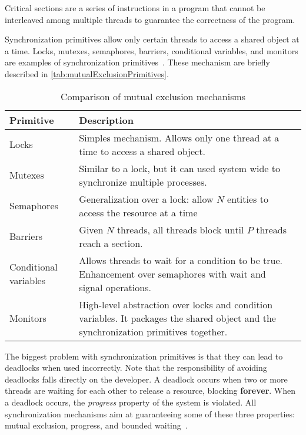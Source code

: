 \begin{tcolorbox}[colback=blue!5!white, colframe=blue!75!black, title=Critical Section]
    Critical sections are a series of instructions in a program that cannot
    be interleaved among multiple threads to guarantee the correctness of the program.
\end{tcolorbox}

Synchronization primitives allow
only certain threads to access a shared object at a time.
Locks, mutexes, semaphores, barriers, conditional variables, and monitors
are examples of synchronization primitives~\cite{andrews1983conceptsOfConcurrency,csf2025synchronizationPrimitives}.
These mechanism are briefly described in \autoref{tab:mutualExclusionPrimitives}.

\begin{table}[!htb]
    \caption{Comparison of mutual exclusion mechanisms}
    \label{tab:mutualExclusionPrimitives}
    \centering
    \begin{tabularx}{\textwidth}{|l|X|X|}
        \hline
        \textbf{Primitive} & \textbf{Description}\\
        \hline
        Locks & 
        Simples mechanism. Allows only one thread at a time to access a shared object.\\
        \hline
        Mutexes & 
        Similar to a lock, but it can used system wide to synchronize multiple processes.\\
        \hline
        Semaphores & 
        Generalization over a lock: allow $N$ entities to access the resource at a time\\
        \hline
        Barriers &
        Given $N$ threads, all threads block until $P$ threads reach a section.\\
        \hline
        Conditional variables &
        Allows threads to wait for a condition to be true. Enhancement
        over semaphores with wait and signal operations.\\
        \hline
        Monitors &
        High-level abstraction over locks and condition variables. It packages
        the shared object and the synchronization primitives together.\\
        \hline
    \end{tabularx}
\end{table}

The biggest problem with synchronization primitives is that they can
lead to deadlocks when used incorrectly. Note that
the responsibility of avoiding deadlocks falls directly on the developer.
A deadlock occurs when two or more threads are waiting
for each other to release a resource, blocking \textbf{forever}.
When a deadlock occurs, the \textit{progress} property
of the system is violated. All synchronization mechanisms aim
at guaranteeing some of these three properties:
mutual exclusion, progress, and bounded waiting~\cite{csf2025synchronizationPrimitives}.


